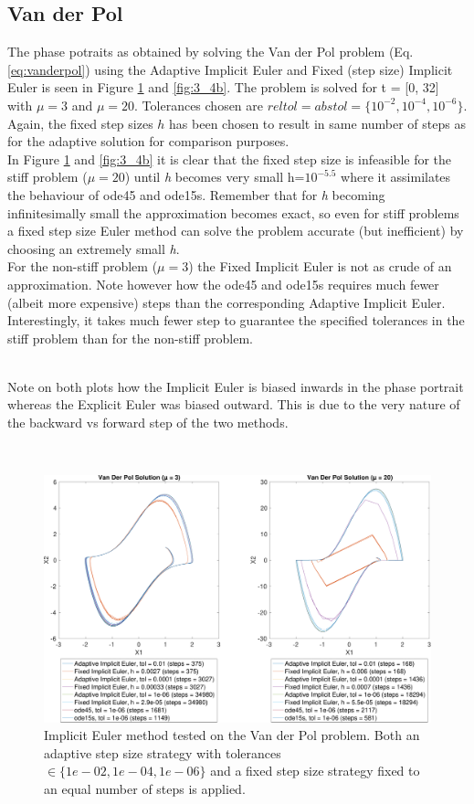 \subsection{Van der Pol}
The phase potraits as obtained by solving the Van der Pol problem (Eq. \ref{eq:vanderpol}) using the Adaptive Implicit Euler and Fixed (step size) Implicit Euler is seen in Figure \ref{fig:3_4a} and \ref{fig:3_4b}. The problem is solved for t = [0, 32] with $\mu = 3$ and $\mu =20$. Tolerances chosen are $reltol = abstol = \{10^{-2}, 10^{-4}, 10^{-6}\}$. Again, the fixed step sizes $h$ has been chosen to result in same number of steps as for the adaptive solution for comparison purposes.
\\
In Figure \ref{fig:3_4a} and \ref{fig:3_4b} it is clear that the fixed step size is infeasible for the stiff problem ($\mu = 20$) until \textit{h} becomes very small h=$10^{-5.5}$ where it assimilates the behaviour of ode45 and ode15s. Remember that for \textit{h} becoming infinitesimally small the approximation becomes exact, so even for stiff problems a fixed step size Euler method can solve the problem accurate (but inefficient) by choosing an extremely small \textit{h}.\\
For the non-stiff problem ($\mu = 3$) the Fixed Implicit Euler is not as crude of an approximation. Note however how the ode45 and ode15s requires much fewer (albeit more expensive) steps than the corresponding Adaptive Implicit Euler. \\
Interestingly, it takes much fewer step to guarantee the specified tolerances in the stiff problem than for the non-stiff problem. 

\\
Note on both plots how the Implicit Euler is biased inwards in the phase portrait whereas the Explicit Euler was biased outward. This is due to the very nature of the backward vs forward step of the two methods.

\\



\begin{figure}
    \centering
    \includegraphics[width=\textwidth]{plots/3_4main.pdf}
    \caption{Implicit Euler method tested on the Van der Pol problem. Both an adaptive step size strategy with tolerances $\in \{1e-02, 1e-04, 1e-06\}$ and a fixed step size strategy fixed to an equal number of steps is applied.}
    \label{fig:3_4a}
\end{figure}

